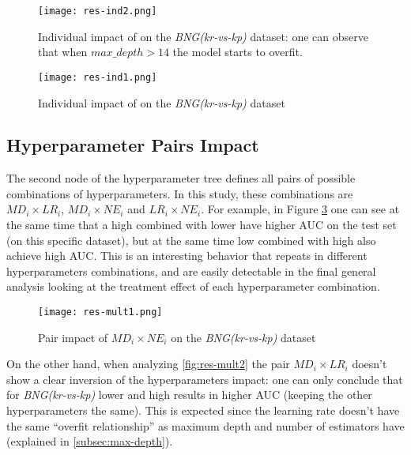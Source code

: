 \begin{figure}[!h]
    \centering
    \texttt{[image: res-ind2.png]} 
    \caption{Individual impact of \textbf{} on the \textit{BNG(kr-vs-kp)} dataset: one can observe that when $max\_depth > 14$ the model starts to overfit.}
    \label{fig:res-ind2}
\end{figure}

\begin{figure}[!h]
    \centering
    \texttt{[image: res-ind1.png]} 
    \caption{Individual impact of \textbf{} on the \textit{BNG(kr-vs-kp)} dataset}
    \label{fig:res-ind1}
\end{figure}

\subsection{Hyperparameter Pairs Impact}
\label{subsec:double-impact}

The second node of the hyperparameter tree defines all pairs of possible combinations of hyperparameters. In this study, these combinations are $MD_i \times LR_i$, $MD_i \times NE_i$ and $LR_i \times NE_i$. For example, in Figure \ref{fig:res-mult1} one can see at the same time that a high \textbf{} combined with lower \textbf{} have higher AUC on the test set (on this specific dataset), but at the same time low \textbf{} combined with high \textbf{} also achieve high AUC. This is an interesting behavior that repeats in different hyperparameters combinations, and are easily detectable in the final general analysis looking at the treatment effect of each hyperparameter combination.

\begin{figure}[!h]
    \centering
    \texttt{[image: res-mult1.png]} 
    \caption{Pair impact of $MD_i \times NE_i$  on the \textit{BNG(kr-vs-kp)} dataset}
    \label{fig:res-mult1}
\end{figure}

On the other hand, when analyzing \ref{fig:res-mult2} the pair $MD_i \times LR_i$ doesn't show a clear inversion of the hyperparameters impact: one can only conclude that for \textit{BNG(kr-vs-kp)} lower \textbf{} and high \textbf{} results in higher AUC (keeping the other hyperparameters the same). This is expected since the learning rate doesn't have the same ``overfit relationship'' as maximum depth and number of estimators have (explained in \ref{subsec:max-depth}).

